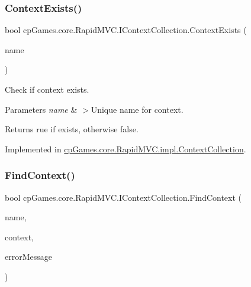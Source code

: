 \subsubsection{\texorpdfstring{ContextExists()}{ContextExists()}}
{\footnotesize\ttfamily bool cp\+Games.\+core.\+Rapid\+M\+V\+C.\+I\+Context\+Collection.\+Context\+Exists (\begin{DoxyParamCaption}\item[{string}]{name }\end{DoxyParamCaption})}



Check if context exists. 


\begin{DoxyParams}{Parameters}
{\em name} & $>$Unique name for context.\\
\hline
\end{DoxyParams}
\begin{DoxyReturn}{Returns}
rue if exists, otherwise false.
\end{DoxyReturn}


Implemented in \mbox{\hyperlink{classcp_games_1_1core_1_1_rapid_m_v_c_1_1impl_1_1_context_collection_a288b7ee5d4388b498e8b213694761b4a}{cp\+Games.\+core.\+Rapid\+M\+V\+C.\+impl.\+Context\+Collection}}.

\mbox{\label{interfacecp_games_1_1core_1_1_rapid_m_v_c_1_1_i_context_collection_a6c71646f1bf15267a72d0b48217eb7bc}} 
\subsubsection{\texorpdfstring{FindContext()}{FindContext()}}
{\footnotesize\ttfamily bool cp\+Games.\+core.\+Rapid\+M\+V\+C.\+I\+Context\+Collection.\+Find\+Context (\begin{DoxyParamCaption}\item[{string}]{name,  }\item[{out \mbox{\hyperlink{interfacecp_games_1_1core_1_1_rapid_m_v_c_1_1_i_context}{I\+Context}}}]{context,  }\item[{out string}]{error\+Message }\end{DoxyParamCaption})}



